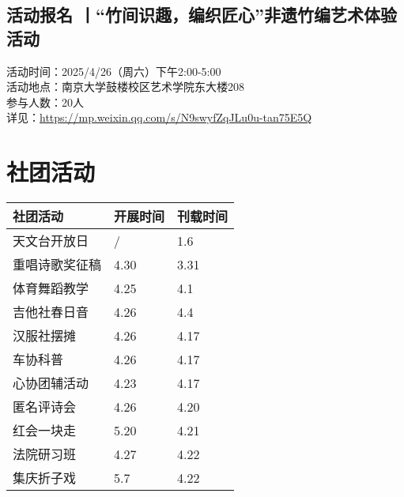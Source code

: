\documentclass[letterpaper, 12pt]{article}
\begin{document}
\begin{multicols}{2}
\subsection{活动报名 丨“竹间识趣，编织匠心”非遗竹编艺术体验活动} %
 活动时间：2025/4/26（周六）下午2:00-5:00  
\\活动地点：南京大学鼓楼校区艺术学院东大楼208
\\参与人数：20人
\\详见：\url{https://mp.weixin.qq.com/s/N9swyfZqJLu0u-tan75E5Q}


\section{社团活动}
\begin{tabular}{|>{\centering\arraybackslash}m{}|m{}|m{}|}
    \hline
    社团活动 & 开展时间 & 刊载时间\\
    \hline\hline
    天文台开放日 & / & 1.6\\
    重唱诗歌奖征稿 & 4.30 & 3.31\\
    体育舞蹈教学 & 4.25 & 4.1\\
    吉他社春日音 & 4.26 & 4.4\\
    汉服社摆摊 & 4.26 & 4.17\\
    车协科普 & 4.26 & 4.17\\
    心协团辅活动 & 4.23 & 4.17\\
    匿名评诗会 & 4.26 & 4.20\\
    红会一块走 & 5.20 & 4.21\\
    法院研习班 & 4.27 & 4.22\\
    集庆折子戏 & 5.7 & 4.22\\
    \hline
\end{tabular}

\end{multicols}
\end{document}
